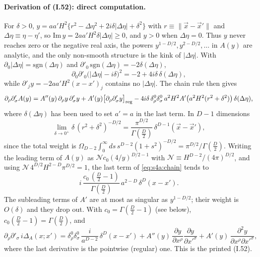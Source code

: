 \documentclass[aps,prd,onecolumn,10pt,nofootinbib,floatfix]{revtex4-2}
\newcommand{\eqI}[1]{(I.#1)}
\begin{document}
\paragraph*{Derivation of (I.52): direct computation.}
For $\delta>0$,
$y=aa'H^2\{r^2-\Delta\eta^2+2i\delta|\Delta\eta|+\delta^2\}$ with $r\equiv\|\vec x-\vec x'\|$ and
$\Delta\eta\equiv\eta-\eta'$, so $\mathrm{Im}\,y=2aa'H^2\delta|\Delta\eta|\ge0$, and $y>0$ when
$\Delta\eta=0$. Thus $y$ never reaches zero or the negative real axis, the powers $y^{1-D/2},y^{2-D/2},\dots$
in $A(y)$ are analytic, and the only non-smooth structure is the kink of $|\Delta\eta|$. With
$\partial_0|\Delta\eta|=\mathrm{sgn}(\Delta\eta)$ and $\partial'_0\,\mathrm{sgn}(\Delta\eta)=-2\delta(\Delta\eta)$,
\begin{equation}
\partial_0\partial'_0\big(|\Delta\eta|-i\delta\big)^2=-2+4i\delta\,\delta(\Delta\eta),
\label{eq:s4a:kink}
\end{equation}
while $\partial'_jy=-2aa'H^2(x-x')_j$ contains no $|\Delta\eta|$. The chain rule then gives
\begin{equation}
\partial_\rho\partial'_\sigma A(y)=A''(y)\,\partial_\rho y\,\partial'_\sigma y+A'(y)\big[\partial_\rho\partial'_\sigma y\big]_{\rm reg}
-4i\delta\,\delta^0_\rho\delta^0_\sigma\,a^2H^2A'\big(a^2H^2(r^2+\delta^2)\big)\,\delta(\Delta\eta),
\label{eq:s4a:chain}
\end{equation}
where $\delta(\Delta\eta)$ has been used to set $a'=a$ in the last term. In $D-1$ dimensions
\begin{equation}
\lim_{\delta\to0^+}\delta\,(r^2+\delta^2)^{-D/2}=\frac{\pi^{D/2}}{\Gamma(\frac D2)}\,\delta^{D-1}(\vec x-\vec x'),
\label{eq:s4a:nascent}
\end{equation}
since the total weight is
$\Omega_{D-2}\int_0^\infty ds\,s^{D-2}(1+s^2)^{-D/2}=\pi^{D/2}/\Gamma(\frac D2)$. Writing the leading term of
$A(y)$ as $\mathcal N c_0(4/y)^{D/2-1}$ with $\mathcal N\equiv H^{D-2}/(4\pi)^{D/2}$, and using
$\mathcal N\,4^{D/2}H^{2-D}\pi^{D/2}=1$, the last term of \eqref{eq:s4a:chain} tends to
\begin{equation}
i\,\frac{c_0\,(\frac D2-1)}{\Gamma(\frac D2)}\,a^{2-D}\,\delta^D(x-x').
\label{eq:s4a:lead}
\end{equation}
The subleading terms of $A'$ are at most as singular as $y^{1-D/2}$; their weight is $O(\delta)$ and
they drop out. With $c_0=\Gamma(\frac D2-1)$ (see below), $c_0(\frac D2-1)=\Gamma(\frac D2)$, and
\begin{equation}
\partial_\rho\partial'_\sigma\,i\Delta_A(x;x')=\delta^0_\rho\delta^0_\sigma\,\frac{i}{a^{D-2}}\,\delta^D(x-x')
+A''(y)\,\frac{\partial y}{\partial x^\rho}\frac{\partial y}{\partial x'^\sigma}+A'(y)\,\frac{\partial^2y}{\partial x^\rho\partial x'^\sigma},
\label{eq:s4a:52}
\end{equation}
where the last derivative is the pointwise (regular) one. This is the printed \eqI{52}.
\end{document}
